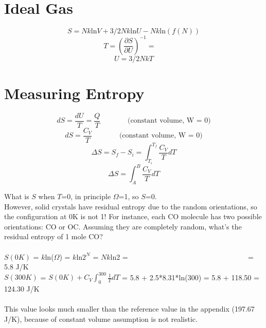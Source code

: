 \section{Ideal Gas}

\begin{equation} S = Nk\text{ln}V + 3/2Nk\text{ln}U - Nk\text{ln}(f(N)) \end{equation}
\begin{equation} T = (\frac {\partial{S}} {\partial{U}}) ^{-1} = ~~~~~\end{equation}
\begin{equation} U = 3/2NkT \end{equation}


\section{Measuring Entropy}
\begin{equation} dS = \frac{dU}{T} = \frac{Q}{T}   ~~~~~~~~~~~~~~~~~ \text{(constant volume, W = 0)}\end{equation}
\begin{equation} dS = \frac{C_V}{T}   ~~~~~~~~~~~~~~~~~ \text{(constant volume, W = 0)}\end{equation}
\begin{equation} \Delta{S} = S_f-S_i = \int^{T_f}_{T_i} \frac{C_V}{T} dT \end{equation}
\begin{equation} \Delta{S} = \int^B_A \frac{C_V}{T} dT \end{equation}

What is $S$ when $T$=0, in principle $\Omega$=1, so $S$=0.\\
However, solid crystals have residual entropy due to the random orientations, so the configuration at 0K is not 1!
For instance, each CO molecule has two possible orientations: CO or OC. Assuming they are completely random, what's the residual entropy of 1 mole CO?\\\\
$S(0K)$ = $k$ln($\Omega$) = $k$ln$2^N$ = $Nk$ln2 = ~~~~~~~~~~~~~~~~~~~~~~~~~~~~~~~~ = 5.8 J/K\\
$S(300K)$ = $S(0K) + C_V \int^{300}_{0} \frac{1}{T} dT$ = 5.8 + 2.5*8.31*ln(300) = 5.8 + 118.50 = 124.30 J/K\\\\
This value looks much smaller than the reference value in the appendix (197.67 J/K), because of constant volume assumption is not realistic.

